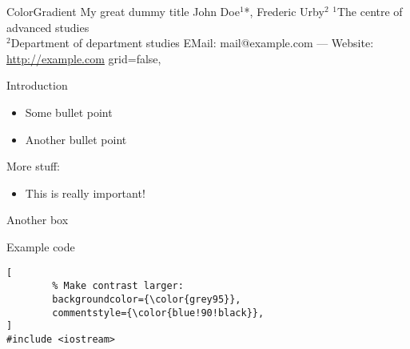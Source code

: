 \documentclass[fontscale=0.34]{MFHposter}
\begin{document}
%
\begin{mfhposter}%
	{\vspace{1cm}\makeimagetitle%
		{ColorGradient}%
		{%
			\color{white}%
			My great dummy title
		}%
		{%
			\color{grey95}%
			John Doe$^1$*, Frederic Urby$^2$
		}%
		{%
			\color{grey95}%
			$^1$The centre of advanced studies\\%
			$^2$Department of department studies%
		}%
		{%
			\color{grey95}%
			EMail: mail@example.com --- Website: \url{http://example.com}%
		}%
	}%
	{}{}%
	{ %
		grid=false,
	}

\begin{posterbox}[name=intro,row=0]{Introduction}
\begin{itemize}
	\item Some bullet point
	\item Another bullet point
\end{itemize}

\vspace{0.4em}
More stuff:
\begin{itemize}
	\item This is \alert{really} important!
\end{itemize}

\vspace{5cm}
\end{posterbox}


\begin{posterbox}[name=another,below=intro]{Another box}
\vspace{5cm}
\begin{center}
\end{center}
\vspace{5cm}
\end{posterbox}

\begin{posterbox}[below=another,above=bottom]{Example code}
\vspace{3cm}
\begin{flushright}
\begin{minipage}{0.97\textwidth}
	\begin{lstlisting}[
		% Make contrast larger:
		backgroundcolor={\color{grey95}},
		commentstyle={\color{blue!90!black}},
]
#include <iostream>


\end{lstlisting}
\end{minipage}
\end{flushright}
\end{posterbox}
\end{mfhposter}
\end{document}
